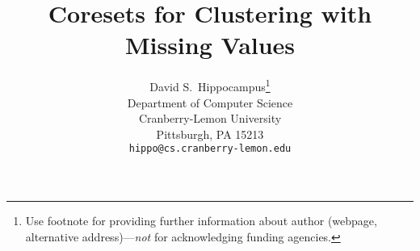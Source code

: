 \documentclass{article}
\title{Coresets for Clustering with Missing Values}
\author{%
  David S.~Hippocampus\thanks{Use footnote for providing further information
    about author (webpage, alternative address)---\emph{not} for acknowledging
    funding agencies.} \\
  Department of Computer Science\\
  Cranberry-Lemon University\\
  Pittsburgh, PA 15213 \\
  \texttt{hippo@cs.cranberry-lemon.edu} \\
}
\theoremstyle{plain}
\theoremstyle{definition}
\theoremstyle{remark}
\begin{document}
\maketitle



%







\newpage

\begin{appendices}
  
\end{appendices}
\end{document}
